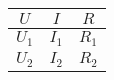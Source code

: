 \begin{tabular}{|c|c|c|}
    \hline
    $U$   & $I$   & $R$   \\
    \hline
    \hline
    $U_1$ & $I_1$ & $R_1$ \\
    \hline
    $U_2$ & $I_2$ & $R_2$ \\
    \hline
\end{tabular}